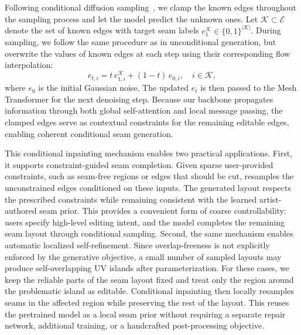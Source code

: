 Following conditional diffusion sampling~\cite{lugmayr2022repaint}, we clamp the known edges throughout the sampling process and let the model predict the unknown ones.
Let $\mathcal{K} \subset \mathcal{E}$ denote the set of known edges with target seam labels $e_1^{\mathcal{K}} \in \{0,1\}^{|\mathcal{K}|}$.
During sampling, we follow the same procedure as in unconditional generation, but overwrite the values of known edges at each step using their corresponding flow interpolation:
\[
e_{t,i} = t\, e_{1,i}^{\mathcal{K}} + (1-t)\, e_{0,i}, \quad i \in \mathcal{K},
\]
where $e_0$ is the initial Gaussian noise.
The updated $e_t$ is then passed to the Mesh Transformer for the next denoising step.
Because our backbone propagates information through both global self-attention and local message passing, the clamped edges serve as contextual constraints for the remaining editable edges, enabling coherent conditional seam generation.


This conditional inpainting mechanism enables two practical applications.
First, it supports constraint-guided seam completion.
Given sparse user-provided constraints, such as seam-free regions or edges that should be cut, \methodname{} resamples the unconstrained edges conditioned on these inputs.
The generated layout respects the prescribed constraints while remaining consistent with the learned artist-authored seam prior.
This provides a convenient form of coarse controllability: users specify high-level editing intent, and the model completes the remaining seam layout through conditional sampling.
Second, the same mechanism enables automatic localized self-refinement.
Since overlap-freeness is not explicitly enforced by the generative objective, a small number of sampled layouts may produce self-overlapping UV islands after parameterization.
For these cases, we keep the reliable parts of the seam layout fixed and treat only the region around the problematic island as editable.
Conditional inpainting then locally resamples seams in the affected region while preserving the rest of the layout.
This reuses the pretrained model as a local seam prior without requiring a separate repair network, additional training, or a handcrafted post-processing objective.


